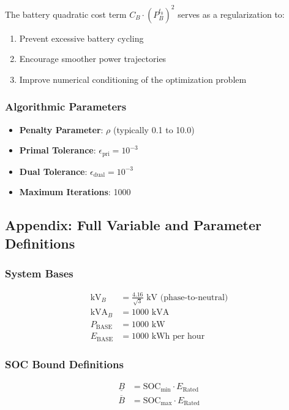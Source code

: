 The battery quadratic cost term $C_B \cdot \left(P_{B}^{t_0}\right)^2$ serves as a regularization to:
\begin{enumerate}
    \item Prevent excessive battery cycling
    \item Encourage smoother power trajectories
    \item Improve numerical conditioning of the optimization problem
\end{enumerate}

\subsubsection{Algorithmic Parameters}

\begin{itemize}
    \item \textbf{Penalty Parameter}: $\rho$ (typically 0.1 to 10.0)
    \item \textbf{Primal Tolerance}: $\epsilon_{\text{pri}} = 10^{-3}$
    \item \textbf{Dual Tolerance}: $\epsilon_{\text{dual}} = 10^{-3}$
    \item \textbf{Maximum Iterations}: 1000
\end{itemize}

\subsection{Appendix: Full Variable and Parameter Definitions}

\subsubsection{System Bases}
\begin{align}
\text{kV}_B &= \frac{4.16}{\sqrt{3}} \text{ kV (phase-to-neutral)} \\
\text{kVA}_B &= 1000 \text{ kVA} \\
P_{\text{BASE}} &= 1000 \text{ kW} \\
E_{\text{BASE}} &= 1000 \text{ kWh per hour}
\end{align}

\subsubsection{SOC Bound Definitions}
\begin{align}
\underline{B} &= \text{SOC}_{\min} \cdot E_{\text{Rated}} \\
\overline{B} &= \text{SOC}_{\max} \cdot E_{\text{Rated}}
\end{align}

